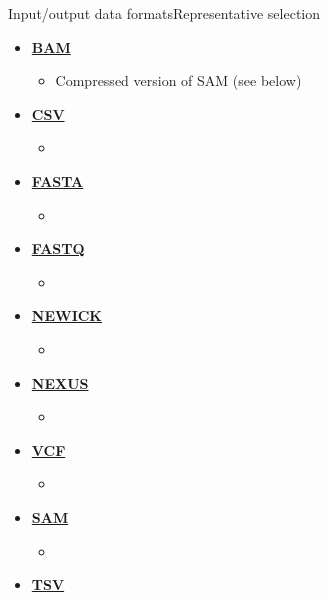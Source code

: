 \documentclass[compress, ucs, xelatex, 11pt, xcolor=svgnames,
  hyperref={
    bookmarks=true,
    unicode=true,
    colorlinks=true,
    pdftitle={Molecular data in R},
    plainpages=false,
    pdfauthor={Vojtech Zeisek},
    pdfsubject={Course about phylogeny and evolution in R},
    pdfcreator={XeLaTeX},
    pdfkeywords={R, evolution, phylogeny, molecular data},
    linkcolor=Tomato,
    anchorcolor=SaddleBrown,
    citecolor=Goldenrod,
    filecolor=DarkMagenta,
    menucolor=Sienna,
    urlcolor=DarkTurquoise,
    pdftex},
  url={hyphens, lowtilde} %
  ]{beamer}
\begin{document}
\begin{frame}[allowframebreaks]{Input/output data formats}{Representative selection} %
  \begin{itemize}
    \item \href{https://en.wikipedia.org/wiki/Binary_Alignment_Map}{\textbf{BAM}}
    \begin{itemize}
      \item Compressed version of SAM (see below)
    \end{itemize}
    \item \href{https://en.wikipedia.org/wiki/Comma-separated_values}{\textbf{CSV}}
    \begin{itemize}
      \item 
    \end{itemize}
    \item \href{https://en.wikipedia.org/wiki/FASTA_format}{\textbf{FASTA}}
    \begin{itemize}
      \item 
    \end{itemize}
    \item \href{https://en.wikipedia.org/wiki/FASTQ_format}{\textbf{FASTQ}}
    \begin{itemize}
      \item 
    \end{itemize}
    \item \href{https://en.wikipedia.org/wiki/Newick_format}{\textbf{NEWICK}}
    \begin{itemize}
      \item 
    \end{itemize}
    \item \href{https://en.wikipedia.org/wiki/Nexus_file}{\textbf{NEXUS}}
    \begin{itemize}
      \item 
    \end{itemize}
    \item \href{https://en.wikipedia.org/wiki/Variant_Call_Format}{\textbf{VCF}}
    \begin{itemize}
      \item 
    \end{itemize}
    \item \href{https://en.wikipedia.org/wiki/SAM_(file_format)}{\textbf{SAM}}
    \begin{itemize}
      \item 
    \end{itemize}
    \item \href{https://en.wikipedia.org/wiki/Tab-separated_values}{\textbf{TSV}}

\end{itemize}
\end{frame}
\end{document}
